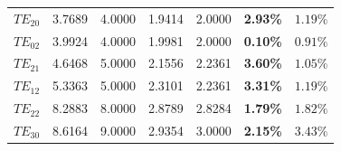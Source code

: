 \documentclass[VANCOUVER,Times1COL]{WileyNJD-v5}
\begin{document}
\begin{table}[!t]
{\begin{tabular}{ccccccc}
            $TE_{20}$                                                                        & 3.7689                                                    & 4.0000                                                    & 1.9414                                                 & 2.0000                                                 & \textbf{2.93\%}                                 & $1.19\%$                                      \\
            $TE_{02}$                                                                        & 3.9924                                                    & 4.0000                                                    & 1.9981                                                 & 2.0000                                                 & \textbf{0.10\%}                                 & $0.91\%$                                      \\
            $TE_{21}$                                                                        & 4.6468                                                    & 5.0000                                                    & 2.1556                                                 & 2.2361                                                 & \textbf{3.60\%}                                 & $1.05\%$                                      \\
            $TE_{12}$                                                                        & 5.3363                                                    & 5.0000                                                    & 2.3101                                                 & 2.2361                                                 & \textbf{3.31\%}                                 & $1.19\%$                                      \\
            $TE_{22}$                                                                        & 8.2883                                                    & 8.0000                                                    & 2.8789                                                 & 2.8284                                                 & \textbf{1.79\%}                                 & $1.82\%$                                      \\
            $TE_{30}$                                                                        & 8.6164                                                    & 9.0000                                                    & 2.9354                                                 & 3.0000                                                 & \textbf{2.15\%}                                 & $3.43\%$                                      \\

\end{tabular}}
\end{table}
\end{document}
